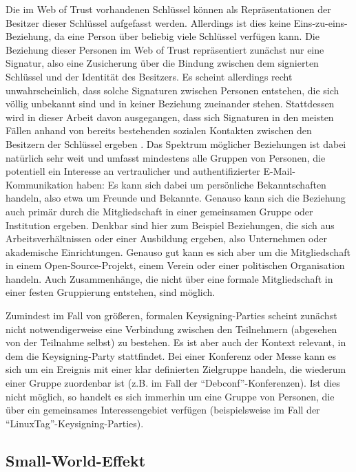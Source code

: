 Die im Web of Trust vorhandenen Schlüssel können als
Repräsentationen der Besitzer dieser Schlüssel aufgefasst
werden. Allerdings ist dies keine Eins-zu-eins-Beziehung, da eine
Person über beliebig viele Schlüssel verfügen kann. Die
Beziehung dieser Personen im Web of Trust repräsentiert zunächst
nur eine Signatur, also eine Zusicherung über die Bindung zwischen
dem signierten Schlüssel und der Identität des Besitzers. Es
scheint allerdings recht unwahrscheinlich, dass solche Signaturen
zwischen Personen entstehen, die sich völlig unbekannt sind und in
keiner Beziehung zueinander stehen. Stattdessen wird in dieser Arbeit
davon ausgegangen, dass sich Signaturen in den meisten Fällen anhand
von bereits bestehenden sozialen Kontakten zwischen den Besitzern der
Schlüssel ergeben \cite{Capkun2002}. Das Spektrum möglicher
Beziehungen ist dabei natürlich sehr weit und umfasst mindestens
alle Gruppen von Personen, die potentiell ein Interesse an
vertraulicher und authentifizierter E-Mail-Kommunikation haben: Es
kann sich dabei um persönliche Bekanntschaften handeln, also etwa um
Freunde und Bekannte. Genauso kann sich die Beziehung auch primär
durch die Mitgliedschaft in einer gemeinsamen Gruppe oder Institution
ergeben. Denkbar sind hier zum Beispiel Beziehungen, die sich aus
Arbeitsverhältnissen oder einer Ausbildung ergeben, also Unternehmen
oder akademische Einrichtungen. Genauso gut kann es sich aber um die
Mitgliedschaft in einem Open-Source-Projekt, einem Verein oder einer
politischen Organisation handeln. Auch Zusammenhänge, die nicht
über eine formale Mitgliedschaft in einer festen Gruppierung
entstehen, sind möglich.

Zumindest im Fall von größeren, formalen Keysigning-Parties scheint
zunächst nicht notwendigerweise eine Verbindung zwischen den
Teilnehmern (abgesehen von der Teilnahme selbst) zu bestehen. Es ist
aber auch der Kontext relevant, in dem die Keysigning-Party
stattfindet. Bei einer Konferenz oder Messe kann es sich um ein
Ereignis mit einer klar definierten Zielgruppe handeln, die wiederum
einer Gruppe zuordenbar ist (z.B. im Fall der
"`Debconf"'-Konferenzen). Ist dies nicht möglich, so handelt es sich
immerhin um eine Gruppe von Personen, die über ein gemeinsames
Interessengebiet verfügen (beispielsweise im Fall der
"`LinuxTag"'-Keysigning-Parties).

\subsection{Small-World-Effekt}
\label{sec:small-world-effekt}

